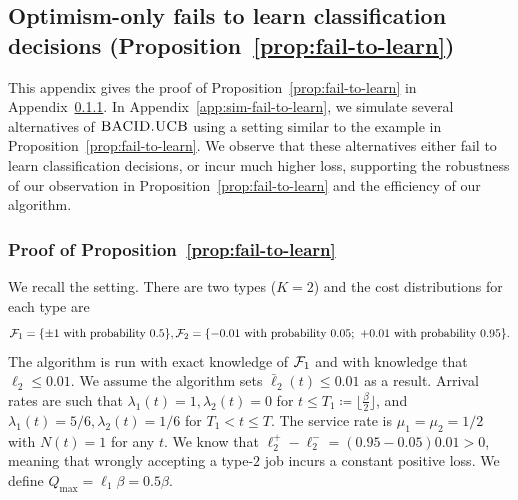 \subsection{Optimism-only fails to learn classification decisions (Proposition~\ref{prop:fail-to-learn})}\label{app:fail-to-learn}
This appendix gives the proof of Proposition~\ref{prop:fail-to-learn} in Appendix~\ref{app:prop-fail-to-learn}. In Appendix~\ref{app:sim-fail-to-learn}, we simulate several alternatives of $\textsc{BACID.UCB}$ using a setting similar to the example in Proposition~\ref{prop:fail-to-learn}. We observe that these alternatives either fail to learn classification decisions, or incur much higher loss, supporting the robustness of our observation in Proposition~\ref{prop:fail-to-learn} and the efficiency of our algorithm.

\subsubsection{Proof of Proposition~\ref{prop:fail-to-learn}}\label{app:prop-fail-to-learn}
We recall the setting. There are two types ($K = 2$) and the cost distributions for each type are
\[
\mathcal{F}_1 = \{\pm 1~\text{with probability 0.5}\}, \mathcal{F}_2 = \{-0.01~\text{with probability 0.05};~+0.01~\text{with probability 0.95}\}.
\]
The algorithm is run with exact knowledge of $\mathcal{F}_1$ and with  knowledge that $\ell_2 \leq 0.01$. We assume the algorithm sets $\bar{\ell}_2(t) \leq 0.01$ as a result. Arrival rates are such that $\lambda_1(t) = 1,\lambda_2(t) = 0$ for $t \leq T_1 \coloneqq \lfloor \frac{\beta}{2} \rfloor$, and $\lambda_1(t) = 5/6, \lambda_2(t) = 1/6$ for $T_1 < t \leq T$. The service rate is $\mu_1 = \mu_2 = 1/2$ with $N(t) = 1$ for any $t$. We know that $\ell_2^+ - \ell_2^- = (0.95 - 0.05)0.01 > 0$, meaning that wrongly accepting a type-$2$ job incurs a constant positive loss. We define $Q_{\max} = \ell_1\beta = 0.5\beta$. 

